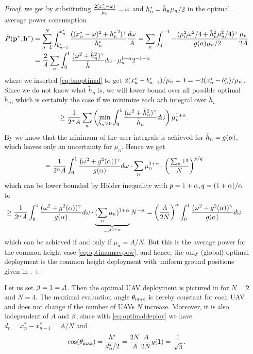 \documentclass[smallabstract,smallcaptions]{dccpaper}
\newcommand{\Pbar}{\ensuremath{\bar{P}}}         %
\begin{document}
\begin{proof}
  we get by substituting $\frac{2(x_n^*-\omega)}{\mu_n}={  \tilde{\omega} }$ and $h^{*}_n=\tilde{h}_n\mu_n/2$  in the optimal average power
  consumption
  \begin{align}
    \Pbar(\vp^*,\vh^*)&=\sum_{n=1}^N \int_{b_{n-1}^*}^{b_n^*} \frac{ ((\pGlob_n-\ome)^2+{\hGlob_n}^2)^{\gam}}{\hGlob_n}\frac{d\ome}{A} 
    = \sum_n \int_{1}^{-1} -\frac{  (\mu_n^2 \tome^2/4 + \tilde{h}_n^2\mu_n^2/4)^{\gam}}{g(\alp)\mu_n/2}
    \frac{\mu_n}{2A}\notag\\
    &=\frac{2}{A}\sum_n \int_0^1 \frac{(\ome^2+\tilde{h}^2_n)^{\gam}}{\tilde{h}}d \ome \cdot \mu_n^{1+\alp} 2^{-1-\alp}
  \end{align}
  where we inserted \eqref{eq:bnoptimal} to get $2(x^{*}_n-b_{n-1}^*)/\mu_n=1=-2(x^{*}_n-b_{n}^*)/\mu_n$.
  Since we do not know what $\tilde{h}_n$ is, we will lower bound over all possible optimal $\tilde{h}_n$, which is
  certainly the case if we minimize each $n$th integral over $\tilde{h}_n$
  \begin{align}
    &\geq\frac{1}{2^{\alpha}A}\sum_n \left(\min_{\tilde{h}_n>0}\int_0^1 \frac{(\omega^2+\tilde{h}^2_n)^{\gamma}}{\tilde{h}_n}d \omega\right)
    \mu_n^{1+\alpha}.
\end{align}
%
By  we know that the minimum of the user integrals is  achieved for $\tilde{h}_n=g(\alpha)$, which leaves
only an uncertainty for $\mu_n$. Hence we get
%
\begin{align}
  &=\frac{1}{2^{\alpha}A} \int_0^1 \frac{(\omega^2+g^2(\alpha))^{\gamma}}{g(\alpha)}d\omega\cdot \sum_n \mu_n^{1+\alpha}\cdot \left(\frac{\sum_n
  1^q}{N}\right)^{p/q}
\end{align}
%
which can be lower bounded by Hölder inequality with $p=1+\alpha, q=(1+\alpha)/\alpha$ to
%
\begin{align}
  &\geq\frac{1}{2^{\alpha}A} 
  \int_0^1 \frac{(\omega^2+g^2(\alpha))^{\gamma}}{g(\alpha)}d\omega\cdot\underbrace{ (\sum_n
    \mu_n)^{1+\alpha}}_{=A^{1+\alpha}} N^{-\alpha}
    =  \left(\frac{A}{2N}\right)^{\alpha}  \int_0^1 \frac{(\omega^2+g^2(\alpha))^{\gamma}}{g(\alpha)}d\omega\notag
\end{align}
%
which can be achieved if and only if $\mu_n=A/N$. But this is the average power for the common height case
\eqref{eq:optimumavpow}, and hence, the only (global) optimal deployment is  the common height deployment with uniform
ground positions given in . 
%
\end{proof}
\color{black}

Let us set $\beta=1=A$. Then the optimal UAV deployment is pictured in  for $N=2$ and $N=4$. The
maximal evaluation angle $\theta_{\text{max}}$ is hereby constant for each UAV and does not change if the number of UAVs
$N$ increase.
Moreover, it is also independent of $A$ and $\beta$, since with \eqref{eq:optimaldeploy} we have
$d_n=x^*_n-x^*_{n-1}=A/N$ and
%
\begin{align}
  \cos(\theta_\text{max})= \frac{h^*}{d^*_n/2}= \frac{2N}{A}\frac{A}{2N}   g(1)= \frac{1}{\sqrt{3}}.
\end{align}
\end{document}
